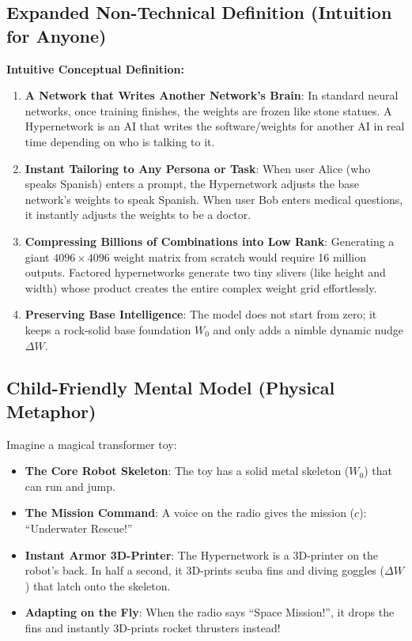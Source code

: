 \documentclass[11pt,a4paper]{article}
\theoremstyle{definition}
\begin{document}
\subsection{Expanded Non-Technical Definition (Intuition for Anyone)}
\textbf{Intuitive Conceptual Definition:}
\begin{enumerate}
    \item \textbf{A Network that Writes Another Network's Brain}: In standard neural networks, once training finishes, the weights are frozen like stone statues. A Hypernetwork is an AI that writes the software/weights for another AI in real time depending on who is talking to it.
    \item \textbf{Instant Tailoring to Any Persona or Task}: When user Alice (who speaks Spanish) enters a prompt, the Hypernetwork adjusts the base network's weights to speak Spanish. When user Bob enters medical questions, it instantly adjusts the weights to be a doctor.
    \item \textbf{Compressing Billions of Combinations into Low Rank}: Generating a giant $4096 \times 4096$ weight matrix from scratch would require 16 million outputs. Factored hypernetworks generate two tiny slivers (like height and width) whose product creates the entire complex weight grid effortlessly.
    \item \textbf{Preserving Base Intelligence}: The model does not start from zero; it keeps a rock-solid base foundation $W_0$ and only adds a nimble dynamic nudge $\Delta W$.
\end{enumerate}

\subsection{Child-Friendly Mental Model (Physical Metaphor)}
Imagine a magical transformer toy:
\begin{itemize}
    \item \textbf{The Core Robot Skeleton}: The toy has a solid metal skeleton ($W_0$) that can run and jump.
    \item \textbf{The Mission Command}: A voice on the radio gives the mission ($c$): ``Underwater Rescue!''
    \item \textbf{Instant Armor 3D-Printer}: The Hypernetwork is a 3D-printer on the robot's back. In half a second, it 3D-prints scuba fins and diving goggles ($\Delta W$) that latch onto the skeleton.
    \item \textbf{Adapting on the Fly}: When the radio says ``Space Mission!'', it drops the fins and instantly 3D-prints rocket thrusters instead!
\end{itemize}
\end{document}
